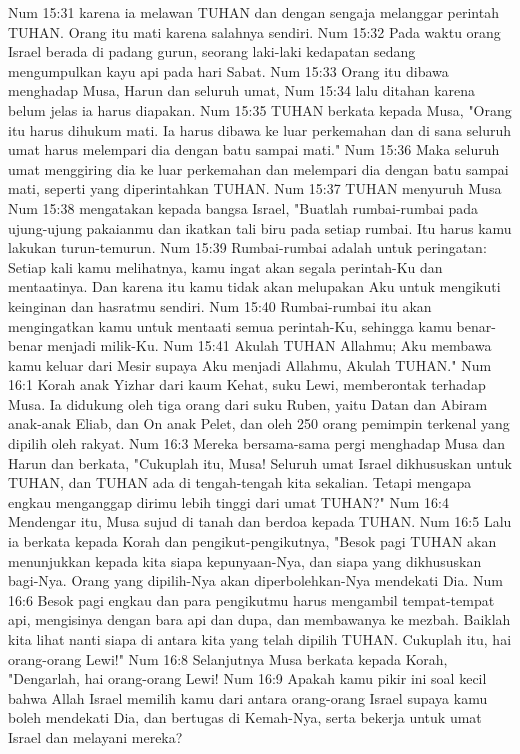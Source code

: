 Num 15:31  karena ia melawan TUHAN dan dengan sengaja melanggar perintah TUHAN. Orang itu mati karena salahnya sendiri.
Num 15:32  Pada waktu orang Israel berada di padang gurun, seorang laki-laki kedapatan sedang mengumpulkan kayu api pada hari Sabat.
Num 15:33  Orang itu dibawa menghadap Musa, Harun dan seluruh umat,
Num 15:34  lalu ditahan karena belum jelas ia harus diapakan.
Num 15:35  TUHAN berkata kepada Musa, "Orang itu harus dihukum mati. Ia harus dibawa ke luar perkemahan dan di sana seluruh umat harus melempari dia dengan batu sampai mati."
Num 15:36  Maka seluruh umat menggiring dia ke luar perkemahan dan melempari dia dengan batu sampai mati, seperti yang diperintahkan TUHAN.
Num 15:37  TUHAN menyuruh Musa
Num 15:38  mengatakan kepada bangsa Israel, "Buatlah rumbai-rumbai pada ujung-ujung pakaianmu dan ikatkan tali biru pada setiap rumbai. Itu harus kamu lakukan turun-temurun.
Num 15:39  Rumbai-rumbai adalah untuk peringatan: Setiap kali kamu melihatnya, kamu ingat akan segala perintah-Ku dan mentaatinya. Dan karena itu kamu tidak akan melupakan Aku untuk mengikuti keinginan dan hasratmu sendiri.
Num 15:40  Rumbai-rumbai itu akan mengingatkan kamu untuk mentaati semua perintah-Ku, sehingga kamu benar-benar menjadi milik-Ku.
Num 15:41  Akulah TUHAN Allahmu; Aku membawa kamu keluar dari Mesir supaya Aku menjadi Allahmu, Akulah TUHAN."
Num 16:1  Korah anak Yizhar dari kaum Kehat, suku Lewi, memberontak terhadap Musa. Ia didukung oleh tiga orang dari suku Ruben, yaitu Datan dan Abiram anak-anak Eliab, dan On anak Pelet, dan oleh 250 orang pemimpin terkenal yang dipilih oleh rakyat.
Num 16:3  Mereka bersama-sama pergi menghadap Musa dan Harun dan berkata, "Cukuplah itu, Musa! Seluruh umat Israel dikhususkan untuk TUHAN, dan TUHAN ada di tengah-tengah kita sekalian. Tetapi mengapa engkau menganggap dirimu lebih tinggi dari umat TUHAN?"
Num 16:4  Mendengar itu, Musa sujud di tanah dan berdoa kepada TUHAN.
Num 16:5  Lalu ia berkata kepada Korah dan pengikut-pengikutnya, "Besok pagi TUHAN akan menunjukkan kepada kita siapa kepunyaan-Nya, dan siapa yang dikhususkan bagi-Nya. Orang yang dipilih-Nya akan diperbolehkan-Nya mendekati Dia.
Num 16:6  Besok pagi engkau dan para pengikutmu harus mengambil tempat-tempat api, mengisinya dengan bara api dan dupa, dan membawanya ke mezbah. Baiklah kita lihat nanti siapa di antara kita yang telah dipilih TUHAN. Cukuplah itu, hai orang-orang Lewi!"
Num 16:8  Selanjutnya Musa berkata kepada Korah, "Dengarlah, hai orang-orang Lewi!
Num 16:9  Apakah kamu pikir ini soal kecil bahwa Allah Israel memilih kamu dari antara orang-orang Israel supaya kamu boleh mendekati Dia, dan bertugas di Kemah-Nya, serta bekerja untuk umat Israel dan melayani mereka?
